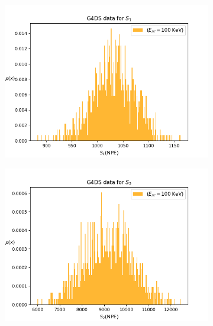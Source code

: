 \documentclass[11pt]{article} %
\begin{document}
\begin{figure}[H]
\begin{minipage}{.5\textwidth}
  \centering
  \begin{subfigure}{.9\textwidth}
      \includegraphics[width=\textwidth]{./images/s1_100.png}
  \end{subfigure}
\end{minipage}
\begin{minipage}{.5\textwidth}
  \centering
  \begin{subfigure}{.9\textwidth}
      \includegraphics[width=\textwidth]{./images/s2_100.png}
  \end{subfigure}
\end{minipage}
\end{figure}
\end{document}

